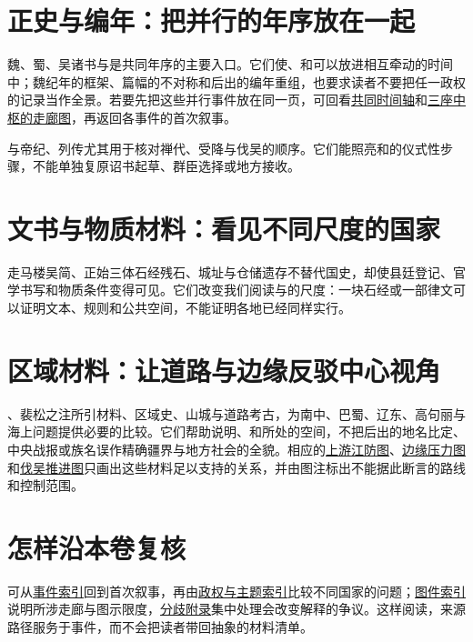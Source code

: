 \section{正史与编年：把并行的年序放在一起}
\label{src:chronicles}

魏、蜀、吴诸书与是共同年序的主要入口。它们使、和可以放进相互牵动的时间中；魏纪年的框架、篇幅的不对称和后出的编年重组，也要求读者不要把任一政权的记录当作全景。若要先把这些并行事件放在同一页，可回看\hyperref[fig:vol02b:period-timeline]{共同时间轴}和\hyperref[fig:vol02b:polity-corridors]{三座中枢的走廊图}，再返回各事件的首次叙事。

与帝纪、列传尤其用于核对禅代、受降与伐吴的顺序。它们能照亮和的仪式性步骤，不能单独复原诏书起草、群臣选择或地方接收。

\section{文书与物质材料：看见不同尺度的国家}
\label{src:documents}

走马楼吴简、正始三体石经残石、城址与仓储遗存不替代国史，却使县廷登记、官学书写和物质条件变得可见。它们改变我们阅读与的尺度：一块石经或一部律文可以证明文本、规则和公共空间，不能证明各地已经同样实行。

\section{区域材料：让道路与边缘反驳中心视角}
\label{src:regional}

、裴松之注所引材料、区域史、山城与道路考古，为南中、巴蜀、辽东、高句丽与海上问题提供必要的比较。它们帮助说明、和所处的空间，不把后出的地名比定、中央战报或族名误作精确疆界与地方社会的全貌。相应的\hyperref[fig:vol02b:yiling-river-defense]{上游江防图}、\hyperref[fig:vol02b:northern-liaodong]{边缘压力图}和\hyperref[fig:vol02b:jin-conquest-wu]{伐吴推进图}只画出这些材料足以支持的关系，并由图注标出不能据此断言的路线和控制范围。

\section{怎样沿本卷复核}
\label{src:routes}

可从\hyperref[app:index:events]{事件索引}回到首次叙事，再由\hyperref[app:index:themes]{政权与主题索引}比较不同国家的问题；\hyperref[app:index:figures]{图件索引}说明所涉走廊与图示限度，\hyperref[app:debates]{分歧附录}集中处理会改变解释的争议。这样阅读，来源路径服务于事件，而不会把读者带回抽象的材料清单。
